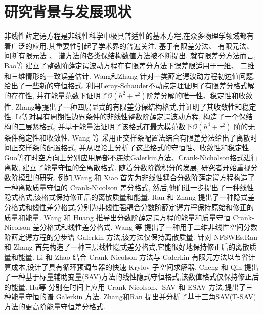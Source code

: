\section{研究背景与发展现状}
非线性薛定谔方程是非线性科学中极具普适性的基本方程,在众多物理学领域都有着广泛的应用.其重要性引起了学术界的普遍关注. 基于有限差分法\cite{liFastEnergyConserving2018}、 有限元法\cite{karakashianSpacetimeFiniteElement1998}、 间断有限元法\cite{zhangConservativeLocalDiscontinuous2017} 、 谱方法\cite{gongConservativeFourierPseudospectral2017}的各类保结构数值方法被不断提出. 
就有限差分方法而言, Bao等\cite{baoUniformErrorEstimates2012} 建立了整数阶薛定谔波动方程在有限差分方法下误差限适用于一维、 二维和三维情形的一致误差估计. 
Wang和Zhang\cite{wangAnalysisNewConservative2006} 针对一类薛定谔波动方程初边值问题, 给出了一些新的守恒格式. 利用Leray-Schauder不动点定理证明了有限差分格式解的存在性,
并在能量范数下证明了$\mathcal{O}(h^2+\tau^2)$阶差分解的唯一性、稳定性和收敛性. Zhang等\cite{zhangConservativeNumericalScheme2003}提出了一种四层显式的有限差分保结构格式,并证明了其收敛性和稳定性. 
Li等\cite{liCompactFiniteDifference2012}对具有周期性边界条件的非线性整数阶薛定谔波动方程, 构造了一个保结构的三层紧格式, 并基于能量法证明了该格式在最大模范数下$\mathcal{O}(h^4+\tau^2)$ 阶的无条件稳定性和收敛性. 
Wang 等\cite{wangDiscretetimeOrthogonalSpline2011} 采用正交样条配置法结合有限差分法给出了离散时间正交样条的配置格式, 并从理论上分析了这些格式的守恒性、收敛性和稳定性. 
Guo等\cite{guoEnergyConservingLocal2015}在时空方向上分别应用局部不连续Galerkin方法、Crank-Nicholson格式进行离散, 建立了能量守恒的全离散格式. 
随着分数阶微积分的发展, 研究者开始重视分数阶模型的研究.
例如,Wang 和 Xiao \cite{wangCrankNicolsonDifference2013} 首先为非线性耦合分数阶薛定谔方程构造了一种离散质量守恒的 Crank-Nicolson 差分格式,
然后,他们进一步提出了一种线性隐式格式,该格式保持修正后的离散质量和能量\cite{wangLinearlyImplicitConservative2014}. 
Ran 和 Zhang \cite{ranConservativeDifferenceScheme2016} 提出了一种隐式差分格式和线性差分格式,分别为非线性强耦合分数阶薛定谔方程保持原始和修正的质量和能量. 
Wang 和 Huang \cite{wangEnergyConservativeDifference2015,wangConservativeLinearizedDifference2015} 推导出分数阶薛定谔方程的能量和质量守恒 Crank-Nicolson 差分格式和线性差分格式.
Wang 等 \cite{wangSplitstepSpectralGalerkin2019} 提出了一种用于二维非线性空间分数阶薛定谔方程的分步谱 Galerkin 方法,该方法仅保持离散质量.
针对 NFSWEs,Ran 和 Zhang \cite{ranLinearlyImplicitConservative2016} 首先构造了一种三层线性隐式差分格式,它能很好地保持修正后的离散质量和能量. 
Li 和 Zhao \cite{liFastEnergyConserving2018} 结合 Crank-Nicolson 方法与 Galerkin 有限元方法以节省计算成本,设计了具有循环预调节器的快速 Krylov 子空间求解器. 
Cheng 和 Qin \cite{chengConvergenceEnergyconservingScheme2022} 提出了一种基于标量辅助变量(SAV)方法的线性隐式守恒格式,该数值格式仅保持修正后的能量.
Hu等 \cite{huEfficientEnergyPreserving2022} 分别在时间上应用 Crank-Nicolson、SAV 和 ESAV 方法,提出了三种能量守恒的谱 Galerkin 方法.
Zhang和Ran \cite{zhangHighorderStructurepreservingDifference2023} 提出并分析了基于三角SAV(T-SAV)方法的更高阶能量守恒差分格式.

